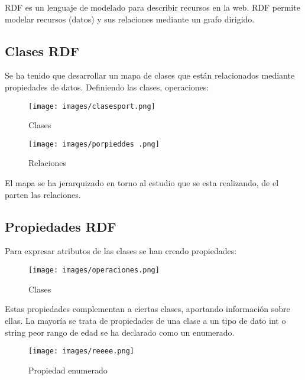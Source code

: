 \documentclass[../main.tex]{subfiles}
\begin{document}
RDF es un lenguaje de modelado para describir recursos en la web. RDF permite modelar recursos (datos) y sus relaciones mediante un grafo dirigido.

\hfill

\subsection{Clases RDF}

Se ha tenido que desarrollar un mapa de clases que están relacionados mediante propiedades de datos. Definiendo las clases, operaciones:

\hfill

\begin{figure}[ht]
    \centering
    \texttt{[image: images/clasesport.png]}
    \caption{Clases}
    \label{clasesport}
\end{figure}


\begin{figure}[h]
    \centering
    \texttt{[image: images/porpieddes .png]}
    \caption{Relaciones}
    \label{Relaciones}
\end{figure}

El mapa se ha jerarquizado en torno al estudio que se esta realizando, de el parten las relaciones.

\newpage

\subsection{Propiedades RDF}

Para expresar atributos de las clases se han creado propiedades:

\hfill

\begin{figure}[ht]
    \centering
    \texttt{[image: images/operaciones.png]}
    \caption{Clases}
    \label{operaciones}
\end{figure}

Estas propiedades complementan a ciertas clases, aportando información sobre ellas. La mayoría se trata de propiedades de una clase a un tipo de dato int o string peor rango de edad se ha declarado como un enumerado.

\hfill

\begin{figure}[ht]
    \centering
    \texttt{[image: images/reeee.png]}
    \caption{Propiedad enumerado}
    \label{reeee}
\end{figure}
\end{document}
